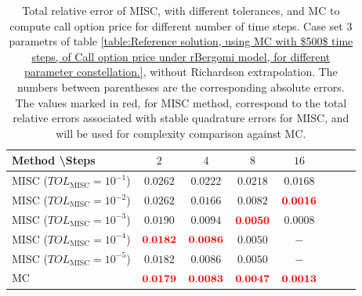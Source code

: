 \begin{table}[h!]
	\centering
	\begin{tabular}{l*{6}{c}r}
		Method \textbackslash  Steps            & $2$ & $4$ & $8$ & $16$  \\
		\hline
		MISC ($TOL_{\text{MISC}}=10^{-1}$)  &  $\mathbf{0.0262}$ & $\mathbf{0.0222}$& $\mathbf{ 0.0218}$ & $\mathbf{ 0.0168}$   \\
		MISC ($TOL_{\text{MISC}}=10^{-2}$)  &  $\mathbf{0.0262}$ & $\mathbf{0.0166}$& $\mathbf{ 0.0082}$ & $\mathbf{ {\color{red}0.0016}}$  \\
		MISC ($TOL_{\text{MISC}}=10^{-3}$)  &  $\mathbf{0.0190}$ & $\mathbf{0.0094}$& $\mathbf{{\color{red}0.0050}}$  & $\mathbf{ 0.0008}$  \\
		MISC ($TOL_{\text{MISC}}=10^{-4}$)  &  $\mathbf{{\color{red}0.0182}}$ & $\mathbf{{\color{red}0.0086}}$& $\mathbf{0.0050}$ & $\mathbf{ -}$ \\
			MISC ($TOL_{\text{MISC}}=10^{-5}$)  &  $\mathbf{0.0182}$ & $\mathbf{0.0086}$& $\mathbf{0.0050}$ & $\mathbf{ -}$ 
			 \\
		\hline
		MC    & $\mathbf{{\color{red}0.0179}}$  & $\mathbf{ {\color{red}0.0083}}$  & $\mathbf{{\color{red}0.0047}}$ & $\mathbf{ {\color{red}0.0013}}$  \\		
		\hline
	\end{tabular}
	\caption{Total relative error of MISC, with different tolerances, and MC to compute call option price for different number of time steps. Case set $3$ parametrs of table \ref{table:Reference solution, using MC with $500$ time steps, of Call option price under rBergomi model, for different parameter constellation.}, without Richardson extrapolation. The numbers between parentheses are the corresponding absolute errors. The values marked in red, for MISC method, correspond to the total relative errors associated with  stable quadrature errors for MISC, and will be used for complexity comparison against MC.}
	\label{Total error of MISC and MC to compute Call option price of the different tolerances for different number of time steps. Case set 3, without Richardson extrapolation. The numbers between parentheses are the corresponding absolute errors.}
\end{table}



